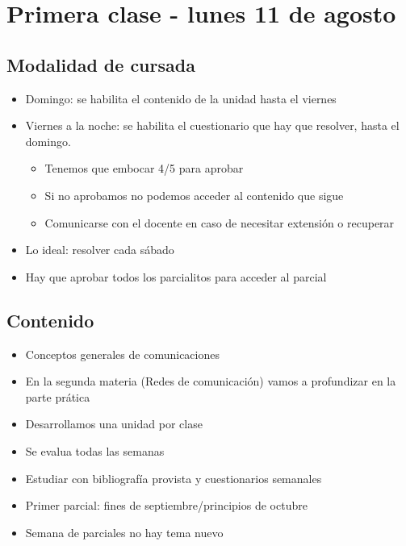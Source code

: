 \section{Primera clase - lunes 11 de agosto}

\subsection{Modalidad de cursada}

\begin{itemize}
    \item Domingo: se habilita el contenido de la unidad hasta el viernes
    \item Viernes a la noche: se habilita el cuestionario que hay que resolver,
    hasta el domingo.
    \begin{itemize}
        \item Tenemos que embocar 4/5 para aprobar
        \item Si no aprobamos no podemos acceder al contenido que sigue
        \item Comunicarse con el docente en caso de necesitar extensión o recuperar
    \end{itemize}
    \item Lo ideal: resolver cada sábado
    \item Hay que aprobar todos los parcialitos para acceder al parcial 
\end{itemize}

\subsection{Contenido}

\begin{itemize}
    \item Conceptos generales de comunicaciones 
    \item En la segunda materia (Redes de comunicación) vamos a profundizar 
    en la parte prática
    \item Desarrollamos una unidad por clase 
    \item Se evalua todas las semanas 
    \item Estudiar con bibliografía provista y cuestionarios semanales 
    \item Primer parcial: fines de septiembre/principios de octubre
    \item Semana de parciales no hay tema nuevo
\end{itemize}

